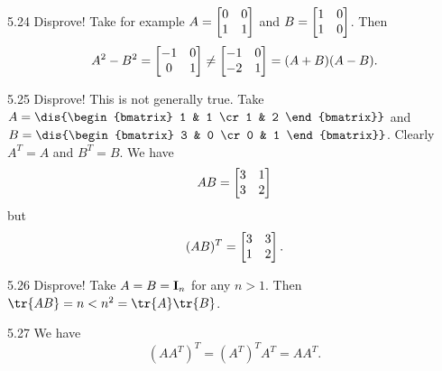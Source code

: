 \begin{RequAnswer}{5.24}
Disprove! Take for example $A = \begin{bmatrix} 0 & 0 \cr 1 & 1
\cr\end{bmatrix}$ and $B = \begin{bmatrix} 1 & 0 \cr 1 & 0
\cr\end{bmatrix}$. Then $$A^2 - B^2 = \begin{bmatrix} -1 & 0 \cr 0 &
1 \cr\end{bmatrix} \neq  \begin{bmatrix} -1 & 0 \cr -2 & 1
\cr\end{bmatrix}= (A+B)(A-B). $$
\end{RequAnswer}
\begin{RequAnswer}{5.25}
Disprove! This is not generally true. Take $A =
\dis{\begin{bmatrix} 1 & 1 \cr 1 & 2
\end{bmatrix}}$ and $B =
\dis{\begin{bmatrix} 3 & 0 \cr 0 & 1
\end{bmatrix}}$. Clearly $A^T = A$ and $B^T = B$. We have
$$AB  = \begin{bmatrix} 3 & 1 \cr 3 & 2\cr\end{bmatrix}$$but
$$(AB)^T  = \begin{bmatrix} 3 & 3 \cr 1 & 2\cr\end{bmatrix}.$$
\end{RequAnswer}
\begin{RequAnswer}{5.26}
Disprove! Take $A = B = {\bf I}_n$ for any $n>1$. Then $\tr{AB} = n< n^2 = \tr{A}\tr{B}$.  
\end{RequAnswer}
\begin{RequAnswer}{5.27}
 We have
$$(AA^T)^T = (A^T)^TA^T = AA^T.$$
\end{RequAnswer}

